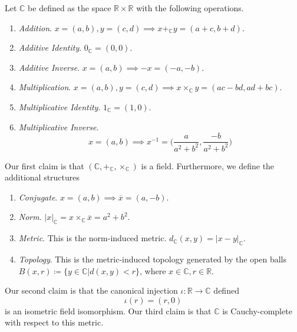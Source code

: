 \documentclass{article}
\begin{document}
    \begin{theorem}
      Let $\mathbb{C}$ be defined as the space $\mathbb{R} \times \mathbb{R}$ with the following operations. 
      \begin{enumerate}
        \item \textit{Addition}. $x = (a, b), y = (c, d) \implies x +_{\mathbb{C}} y = (a + c, b + d)$. 
        \item \textit{Additive Identity}. $0_{\mathbb{C}} = (0, 0)$. 
        \item \textit{Additive Inverse}. $x = (a, b) \implies -x = (-a, -b)$. 
        \item \textit{Multiplication}. $x = (a, b), y = (c, d) \implies x \times_{\mathbb{C}} y = (ac - bd, ad + bc)$. 
        \item \textit{Multiplicative Identity}. $1_{\mathbb{C}} = (1, 0)$. 
        \item \textit{Multiplicative Inverse}. 
        \begin{equation}
          x = (a, b) \implies x^{-1} = \bigg( \frac{a}{a^2 + b^2}, \frac{-b}{a^2 + b^2} \bigg)
        \end{equation}
      \end{enumerate}
      Our first claim is that $(\mathbb{C}, +_{\mathbb{C}}, \times_{\mathbb{C}})$ is a field. Furthermore, we define the additional structures
      \begin{enumerate}
        \item \textit{Conjugate}. $x = (a, b) \implies \overline{x} = (a, -b)$. 
        \item \textit{Norm}. $|x|_{\mathbb{C}} = x \times_{\mathbb{C}} \overline{x} = a^2 + b^2$. 
        \item \textit{Metric}. This is the norm-induced metric. $d_{\mathbb{C}}(x, y) = |x - y|_{\mathbb{C}}$. 
        \item \textit{Topology}. This is the metric-induced topology generated by the open balls $B(x, r) \coloneqq \{y \in \mathbb{C} | d(x, y) < r\}$, where $x \in \mathbb{C}, r \in \mathbb{R}$. 
      \end{enumerate} 
      Our second claim is that the canonical injection $\iota: \mathbb{R} \rightarrow \mathbb{C}$ defined 
      \begin{equation}
        \iota(r) = (r, 0)
      \end{equation}
      is an isometric field isomorphism. Our third claim is that $\mathbb{C}$ is Cauchy-complete with respect to this metric. 
    \end{theorem} 
\end{document}
